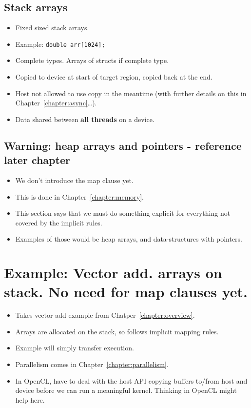 \subsection{Stack arrays}
\begin{itemize}
  \item Fixed sized stack arrays.
  \item Example: {\tt double arr[1024];}
  \item Complete types. Arrays of structs if complete type.
  \item Copied to device at start of target region, copied back at the end.
  \item Host not allowed to use copy in the meantime (with further details on this in Chapter~\ref{chapter:async}\dots).
  \item Data shared between {\bf all threads} on a device.
\end{itemize}

\subsection{Warning: heap arrays and pointers - reference later chapter}
\begin{itemize}
  \item We don't introduce the map clause yet.
  \item This is done in Chapter~\ref{chapter:memory}.
  \item This section says that we must do something explicit for everything not covered by the implicit rules.
  \item Examples of those would be heap arrays, and data-structures with pointers.
\end{itemize}

\section{Example: Vector add. arrays on stack. No need for map clauses yet.}
\begin{itemize}
  \item Takes vector add example from Chatper~\ref{chapter:overview}.
  \item Arrays are allocated on the stack, so follows implicit mapping rules.
  \item Example will simply transfer execution.
  \item Parallelism comes in Chapter~\ref{chapter:parallelism}.
  \item In OpenCL, have to deal with the host API copying buffers to/from host and device before we can run a meaningful kernel. Thinking in OpenCL might help here.
\end{itemize}

